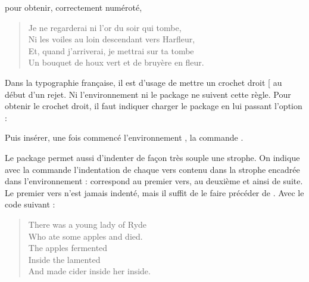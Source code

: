 pour obtenir, correctement numéroté, 

\begin{verse}


Je ne regarderai ni l'or du soir qui tombe,\\
Ni les voiles au loin descendant vers Harfleur,\\
Et, quand j'arriverai, je mettrai sur ta tombe\\
Un bouquet de houx vert et de bruyère en fleur.

\end{verse}

\begin{plusloins}
Dans la typographie française, il est d'usage de mettre un crochet droit [ au début d'un rejet. Ni l'environnement ni le package  ne suivent cette règle. Pour obtenir le crochet droit, il faut indiquer charger le package   en lui passant l'option  :
\begin{latexcode}
\usepackage}[squarebr]{gmverse}
\end{latexcode}
Puis insérer, une fois commencé l'environnement , la commande .
\end{plusloins}

Le package  permet aussi d'indenter de façon très souple une strophe. On indique avec la commande  l'indentation de chaque vers contenu dans la strophe encadrée dans l'environnement :  correspond au premier vers,  au deuxième et ainsi de suite. Le premier vers n'est jamais indenté, mais il suffit de le faire précéder de . Avec le code suivant :

\begin{latexcode}
\begin{verse} 
\begin{patverse} 

\vin There was a young lady of Ryde \\
 Who ate some apples and died.  \\
 The apples fermented \\
 Inside the lamented \\
 And made cider inside her inside. 

\end{patverse}  
\end{verse}
\end{latexcode}

